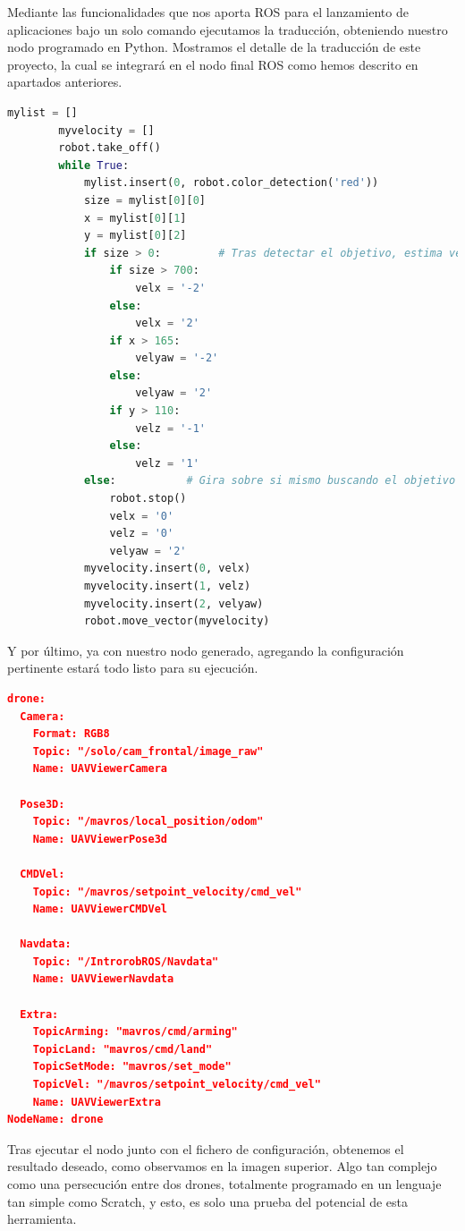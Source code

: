 Mediante las funcionalidades que nos aporta ROS para el lanzamiento de aplicaciones bajo un solo comando ejecutamos la traducción, obteniendo nuestro nodo programado en Python. Mostramos el detalle de la traducción de este proyecto, la cual se integrará en el nodo final ROS como hemos descrito en apartados anteriores.

\begin{lstlisting}[language=python,firstnumber=1]
 		mylist = [] 
 		myvelocity = []
        robot.take_off()
        while True:
            mylist.insert(0, robot.color_detection('red'))
            size = mylist[0][0]
            x = mylist[0][1]
            y = mylist[0][2]
            if size > 0: 		 # Tras detectar el objetivo, estima velocidades
                if size > 700:
                    velx = '-2'
                else:
                    velx = '2'
                if x > 165:
                    velyaw = '-2'
                else:
                    velyaw = '2'               
                if y > 110:
                    velz = '-1'
                else:
                    velz = '1'               
            else:			# Gira sobre si mismo buscando el objetivo
                robot.stop()
                velx = '0'
                velz = '0'
                velyaw = '2'            
            myvelocity.insert(0, velx)
            myvelocity.insert(1, velz)
            myvelocity.insert(2, velyaw)
            robot.move_vector(myvelocity)
\end{lstlisting}

Y por último, ya con nuestro nodo generado, agregando la configuración pertinente estará todo listo para su ejecución.

\begin{lstlisting}[language=json,firstnumber=1]
drone:
  Camera:
    Format: RGB8
    Topic: "/solo/cam_frontal/image_raw"
    Name: UAVViewerCamera
    
  Pose3D:
    Topic: "/mavros/local_position/odom"
    Name: UAVViewerPose3d
    
  CMDVel:
    Topic: "/mavros/setpoint_velocity/cmd_vel"
    Name: UAVViewerCMDVel
    
  Navdata:
    Topic: "/IntrorobROS/Navdata"
    Name: UAVViewerNavdata
    
  Extra:
    TopicArming: "mavros/cmd/arming"
    TopicLand: "mavros/cmd/land"
    TopicSetMode: "mavros/set_mode"
    TopicVel: "/mavros/setpoint_velocity/cmd_vel"
    Name: UAVViewerExtra
NodeName: drone
\end{lstlisting}
Tras ejecutar el nodo junto con el fichero de configuración, obtenemos el resultado deseado, como observamos en la imagen superior. Algo tan complejo como una persecución entre dos drones, totalmente programado en un lenguaje tan simple como Scratch, y esto, es solo una prueba del potencial de esta herramienta.\\


